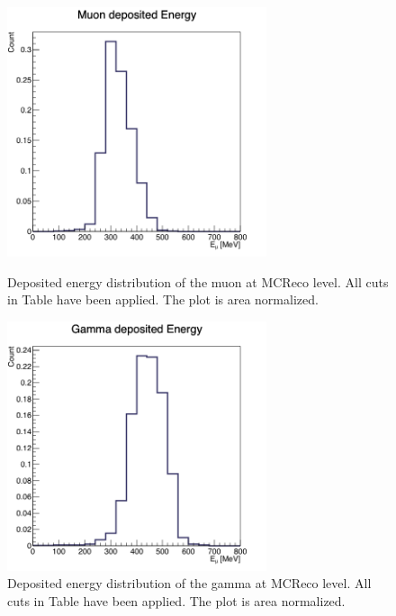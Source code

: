 \documentclass[a4paper, 10pt]{article}
\begin{document}
\begin{figure}[p!]
\centering
\begin{minipage}{0.45\textwidth}
\centering
\includegraphics[width=3in]{pMuGamma/MuonMCEn.png}
\caption{Deposited energy distribution of the muon at MCReco level. All cuts in Table \label{T3} have been applied. The plot is area normalized. }
\label{F1}
\end{minipage}\hfill
\begin{minipage}{0.45\textwidth}
\centering
\includegraphics[width=3in]{pMuGamma/GammaMCEn.png}
\caption{Deposited energy distribution of the gamma at MCReco level. All cuts in Table \label{T3} have been applied. The plot is area normalized.}
\label{F2}
\end{minipage}
\end{figure}
\end{document}
